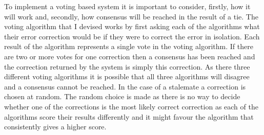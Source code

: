 To implement a voting based system it is important to consider, firstly, how it will work and, secondly, how consensus will be reached in the result of a tie. The voting algorithm that I devised works by first asking each of the algorithms what their error correction would be if they were to correct the error in isolation. Each result of the algorithm represents a single vote in the voting algorithm. If there are two or more votes for one correction then a consensus has been reached and the correction returned by the system is simply this correction. As there three different voting algorithms it is possible that all three algorithms will disagree and a consensus cannot be reached. In the case of a stalemate a correction is chosen at random. The random choice is made as there is no way to decide whether one of the corrections is the most likely correct correction as each of the algorithms score their results differently and it might favour the algorithm that consistently gives a higher score.
